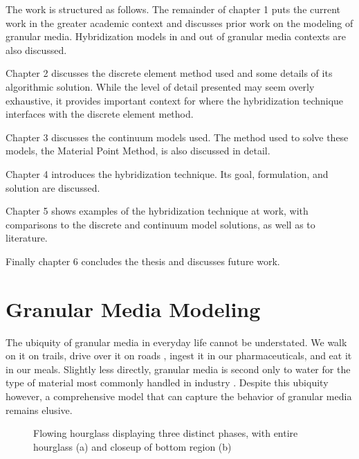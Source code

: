 The work is structured as follows. The remainder of chapter 1 puts the current work in the greater academic context and discusses prior work on the modeling of granular media. Hybridization models in and out of granular media contexts are also discussed. 

Chapter 2 discusses the discrete element method used and some details of its algorithmic solution. While the level of detail presented may seem overly exhaustive, it provides important context for where the hybridization technique interfaces with the discrete element method.

Chapter 3 discusses the continuum models used. The method used to solve these models, the Material Point Method, is also discussed in detail.

Chapter 4 introduces the hybridization technique. Its goal, formulation, and solution are discussed.

Chapter 5 shows examples of the hybridization technique at work, with comparisons to the discrete and continuum model solutions, as well as to literature.

Finally chapter 6 concludes the thesis and discusses future work. 

\section{Granular Media Modeling}

The ubiquity of granular media in everyday life cannot be understated. We walk on it on trails, drive over it on roads \cite{sullivan06}, ingest it in our pharmaceuticals, and eat it in our meals. Slightly less directly, granular media is second only to water for the type of material most commonly handled in industry \cite{Richard:2005:Slow}. Despite this ubiquity however, a comprehensive model that can capture the behavior of granular media remains elusive.


\begin{figure}[htp] 
    \centering
    \hfill%
    \caption{Flowing hourglass displaying three distinct phases, with entire hourglass 			(a) and closeup of bottom region (b)}
    \label{hourglass}
\end{figure}

